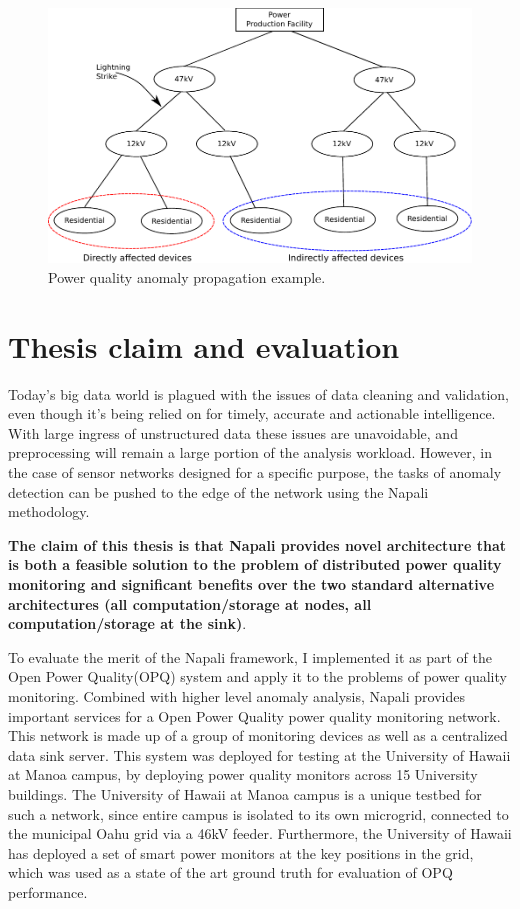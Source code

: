 \begin{figure}[h]
    \centering
    \includegraphics[width=0.9\linewidth]{img/grid_hierarchy_cartoon.pdf}
    \caption{Power quality anomaly propagation example.}
    \label{intro:fig2}
\end{figure}

\section{Thesis claim and evaluation} \label{intro:sec:claim}

Today's big data world is plagued with the issues of data cleaning and validation, even though it's being relied on for timely, accurate and actionable intelligence.
With large ingress of unstructured data these issues are unavoidable, and preprocessing will remain a large portion of the analysis workload.
However, in the case of sensor networks designed for a specific purpose, the tasks of anomaly detection can be pushed to the edge of the network using the Napali methodology.

\begin{tcolorbox}
\textbf{The claim of this thesis is that Napali provides novel architecture that is both a feasible solution to the problem of distributed power quality monitoring and significant benefits over the two standard alternative architectures (all computation/storage at nodes, all computation/storage at the sink)}.
\end{tcolorbox}
To evaluate the merit of the Napali framework, I implemented it as part of the Open Power Quality(OPQ) system and apply it to the problems of power quality monitoring.
Combined with higher level anomaly analysis, Napali provides important services for a Open Power Quality power quality monitoring network.
This network is made up of a group of monitoring devices as well as a centralized data sink server.
This system was deployed for testing at the University of Hawaii at Manoa campus, by deploying power quality monitors across 15 University buildings.
The University of Hawaii at Manoa campus is a unique testbed for such a network, since entire campus is isolated to its own microgrid, connected to the municipal Oahu grid via a 46kV feeder.
Furthermore, the University of Hawaii has deployed a set of smart power monitors at the key positions in the grid, which was used as a state of the art ground truth for evaluation of OPQ performance.


